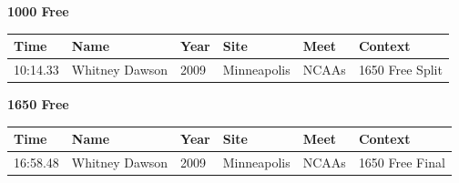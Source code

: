\vspace{1.2em}
\noindent\begin{minipage}[t]{0.98\textwidth}
\centering
\textbf{\textcolor{teamprimary}{1000 Free}}\par
\vspace{0.5em}
\centering
\small
\renewcommand{\arraystretch}{1.0}
\setlength{\tabcolsep}{4pt}
\begin{tabular}{@{}p{2.0cm}p{3.2cm}p{1.2cm}p{2.0cm}p{2.0cm}p{2.5cm}@{}}
\toprule
\textbf{Time} & \textbf{Name} & \textbf{Year} & \textbf{Site} & \textbf{Meet} & \textbf{Context} \\
\midrule
10:14.33 & Whitney Dawson & 2009 & Minneapolis & NCAAs & 1650 Free Split \\
\bottomrule
\end{tabular}
\end{minipage}
\vspace{1.2em}
\noindent\begin{minipage}[t]{0.98\textwidth}
\centering
\textbf{\textcolor{teamprimary}{1650 Free}}\par
\vspace{0.5em}
\centering
\small
\renewcommand{\arraystretch}{1.0}
\setlength{\tabcolsep}{4pt}
\begin{tabular}{@{}p{2.0cm}p{3.2cm}p{1.2cm}p{2.0cm}p{2.0cm}p{2.5cm}@{}}
\toprule
\textbf{Time} & \textbf{Name} & \textbf{Year} & \textbf{Site} & \textbf{Meet} & \textbf{Context} \\
\midrule
16:58.48 & Whitney Dawson & 2009 & Minneapolis & NCAAs & 1650 Free Final \\
\bottomrule
\end{tabular}
\end{minipage}
\vspace{1.2em}
